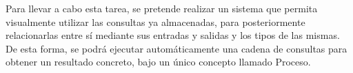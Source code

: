 \vspace{5mm}

Para llevar a cabo esta tarea, se pretende realizar un sistema que permita visualmente utilizar las consultas ya almacenadas, para posteriormente relacionarlas entre sí mediante sus entradas y salidas y los tipos de las mismas. De esta forma, se podrá ejecutar automáticamente una cadena de consultas para obtener un resultado concreto, bajo un único concepto llamado Proceso.


	 